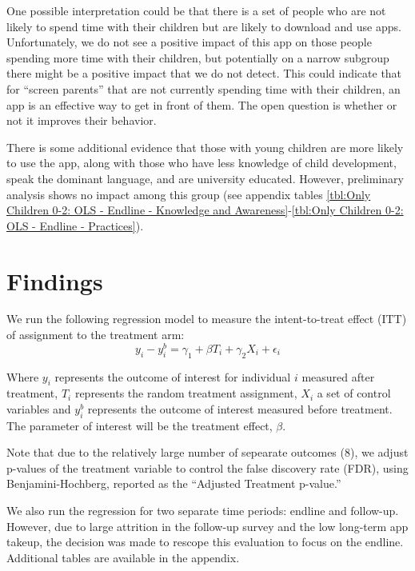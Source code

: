 One possible interpretation could be that there is a set of people who are not likely to spend time with their children but are likely to download and use apps. Unfortunately, we do not see a positive impact of this app on those people spending more time with their children, but potentially on a narrow subgroup there might be a positive impact that we do not detect. This could indicate that for “screen parents” that are not currently spending time with their children, an app is an effective way to get in front of them. The open question is whether or not it improves their behavior.

There is some additional evidence that those with young children are more likely to use the app, along with those who have less knowledge of child development, speak the dominant language, and are university educated. However, preliminary analysis shows no impact among this group (see appendix tables \ref{tbl:Only Children 0-2: OLS - Endline - Knowledge and Awareness}-\ref{tbl:Only Children 0-2: OLS - Endline - Practices}).






\section{Findings}

We run the following regression model to measure the intent-to-treat effect (ITT) of assignment to the treatment arm:
$$
y_{i} - y^{b}_i = \gamma_1 + \beta T_{i} + \gamma_2X_{i} + \epsilon_i
$$

Where $y_i$ represents the outcome of interest for individual $i$ measured after treatment, $T_i$ represents the random treatment assignment, $X_i$ a set of control variables and $y^b_i$ represents the outcome of interest measured before treatment. The parameter of interest will be the treatment effect, $\beta$.

Note that due to the relatively large number of sepearate outcomes (8), we adjust p-values of the treatment variable to control the false discovery rate (FDR), using Benjamini-Hochberg, reported as the ``Adjusted Treatment p-value.''

We also run the regression for two separate time periods: endline and follow-up. However, due to large attrition in the follow-up survey and the low long-term app takeup, the decision was made to rescope this evaluation to focus on the endline. Additional tables are available in the appendix.

